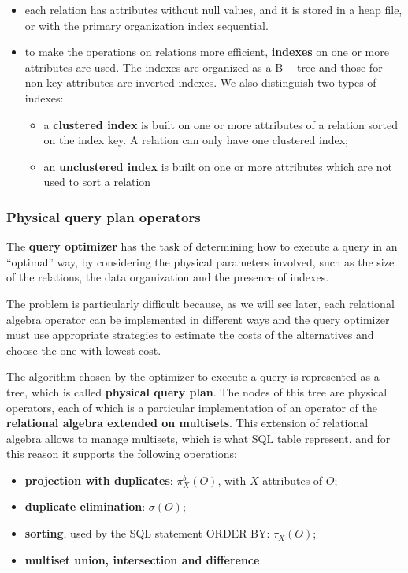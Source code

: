 \begin{itemize}
    \item each relation has attributes without null values, and it is stored in a heap file, or with the primary organization index sequential. 
    \item to make the operations on relations more efficient, \textbf{indexes} on one or more attributes are used. The indexes are organized as a B+–tree and those for non-key attributes are inverted indexes. We also distinguish two types of indexes:
    \begin{itemize}
        \item a \textbf{clustered index} is built on one or more attributes of a relation sorted on the index key. A relation can only  have one clustered index;
        \item an \textbf{unclustered index} is built on one or more attributes which are not used to sort a relation
    \end{itemize} 
\end{itemize}

\subsubsection{Physical query plan operators}

\begin{tcolorbox}
The \textbf{query optimizer} has the task of determining how to execute a query in an “optimal” way, by considering the physical parameters involved, such as the size of the relations, the data organization and the presence of indexes.
\end{tcolorbox}

 The problem is particularly difficult because, as we will see later, each relational algebra operator can be implemented in different ways and the query optimizer must use appropriate strategies to estimate the costs of the alternatives and choose the one with lowest cost. 
 
 The algorithm chosen by the optimizer to execute a query is represented as a tree, which is called \textbf{physical query plan}. The nodes of this tree are physical operators, each of which is a particular implementation of an operator of the \textbf{relational algebra extended on multisets}. This extension of relational algebra allows to manage multisets, which is what SQL table represent, and for this reason it supports the following operations:

 \begin{itemize}
     \item \textbf{projection with duplicates}: $\pi_X^b(O)$, with $X$ attributes of $O$;
     \item \textbf{duplicate elimination}: $\sigma(O)$;
     \item \textbf{sorting}, used by the SQL statement ORDER BY: $\tau_X(O)$;
     \item \textbf{multiset union, intersection and difference}.
 \end{itemize}


